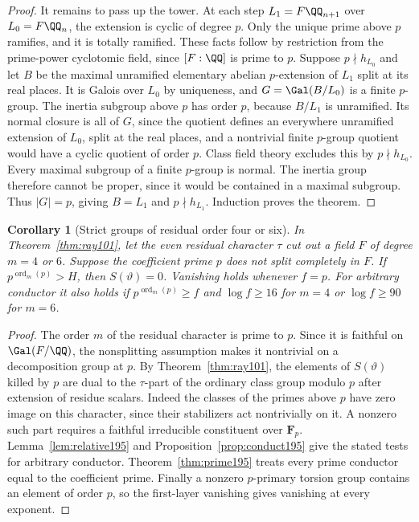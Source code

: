 \documentclass[a4paper,11pt]{article}
\newtheorem{corollary}[proposition]{Corollary}
\theoremstyle{definition}
\theoremstyle{remark}
\numberwithin{equation}{section}
\begin{document}
\begin{proof}
It remains to pass up the tower. At each step
\(L_1=F\QQ_{n+1}\) over \(L_0=F\QQ_n\), the extension is
cyclic of degree \(p\). Only the unique prime above \(p\)
ramifies, and it is totally ramified. These facts follow by
restriction from the prime-power cyclotomic field, since
\([F:\QQ]\) is prime to \(p\). Suppose \(p\nmid h_{L_0}\)
and let \(B\) be the maximal unramified elementary abelian
\(p\)-extension of \(L_1\) split at its real places.
It is Galois over \(L_0\) by uniqueness, and
\(G=\Gal(B/L_0)\) is a finite \(p\)-group.
The inertia subgroup above \(p\) has order \(p\), because
\(B/L_1\) is unramified. Its normal closure is all of \(G\), since
the quotient defines an everywhere unramified extension of
\(L_0\), split at the real places, and a nontrivial finite
\(p\)-group quotient would have a cyclic quotient of order \(p\).
Class field theory excludes this by \(p\nmid h_{L_0}\).
Every maximal subgroup of a finite \(p\)-group is normal.
The inertia group therefore cannot be proper, since it would
be contained in a maximal subgroup. Thus \(|G|=p\), giving
\(B=L_1\) and \(p\nmid h_{L_1}\). Induction proves the theorem.
\end{proof}

\begin{corollary}[Strict groups of residual order four or six]
\label{cor:strict195}
In Theorem~\ref{thm:ray101}, let the even residual character
\(\tau\) cut out a field \(F\) of degree \(m=4\) or \(6\).
Suppose the coefficient prime \(p\) does not split completely
in \(F\). If \(p^{\operatorname{ord}_m(p)}>H\), then
\(S(\vartheta)=0\). Vanishing holds whenever \(f=p\). For
arbitrary conductor it also holds if \(p^{\operatorname{ord}_m(p)}\ge f\) and \(\log f\ge16\)
for \(m=4\) or \(\log f\ge90\) for \(m=6\).
\end{corollary}
\begin{proof}
The order \(m\) of the residual character is prime to \(p\).
Since it is faithful on \(\Gal(F/\QQ)\), the nonsplitting
assumption makes it nontrivial on a decomposition group at
\(p\). By Theorem~\ref{thm:ray101}, the elements of
\(S(\vartheta)\) killed by \(p\) are dual to the
\(\tau\)-part of the ordinary class group modulo \(p\) after
extension of residue scalars. Indeed the classes of the primes
above \(p\) have zero image on this character, since their
stabilizers act nontrivially on it. A nonzero such part requires
a faithful irreducible constituent over \(\mathbf F_p\).
Lemma~\ref{lem:relative195} and Proposition~\ref{prop:conduct195}
give the stated tests for arbitrary conductor.
Theorem~\ref{thm:prime195} treats every prime conductor equal to
the coefficient prime. Finally a nonzero \(p\)-primary torsion
group contains an element of order \(p\), so the first-layer
vanishing gives vanishing at every exponent.
\end{proof}
\end{document}
